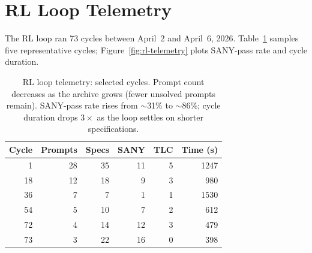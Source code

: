 \documentclass[11pt]{article}
\begin{document}
\section{RL Loop Telemetry}
\label{app:telemetry}

The RL loop ran 73 cycles between April~2 and April~6, 2026.
Table~\ref{tab:telemetry} samples five representative cycles;
Figure~\ref{fig:rl-telemetry} plots SANY-pass rate and cycle duration.

\begin{table}[h]
\centering
\small
\setlength{\tabcolsep}{4pt}
\begin{tabular}{@{}rrrrrr@{}}
\toprule
Cycle & Prompts & Specs & SANY & TLC & Time (s) \\
\midrule
1  & 28 & 35 & 11 & 5 & 1247 \\
18 & 12 & 18 & 9  & 3 & 980  \\
36 & 7  & 7  & 1  & 1 & 1530 \\
54 & 5  & 10 & 7  & 2 & 612  \\
72 & 4  & 14 & 12 & 3 & 479  \\
73 & 3  & 22 & 16 & 0 & 398  \\
\bottomrule
\end{tabular}
\caption{RL loop telemetry: selected cycles.  Prompt count decreases
as the archive grows (fewer unsolved prompts remain).  SANY-pass rate
rises from $\sim$31\% to $\sim$86\%; cycle duration drops $3\times$ as
the loop settles on shorter specifications.}
\label{tab:telemetry}
\end{table}
\end{document}
